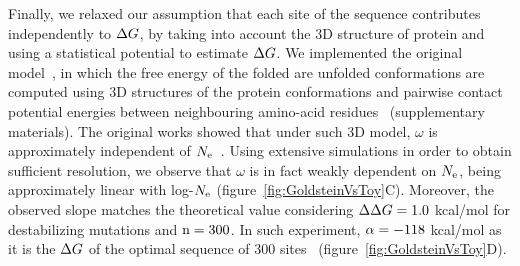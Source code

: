 Finally, we relaxed our assumption that each site of the sequence contributes independently to $\Delta G$, by taking into account the $3$D structure of protein and using a statistical potential to estimate $\Delta G$.
We implemented the original model~\citep{Williams2006, Goldstein2011, Pollock2012}, in which the free energy of the folded are unfolded conformations are computed using $3$D structures of the protein conformations and pairwise contact potential energies between neighbouring amino-acid residues~\citep{Miyazawa1985} (supplementary materials).
The original works showed that under such $3$D model, $\omega$ is approximately independent of $N_{\mathrm{e}}$~\citep{Goldstein2013}.
Using extensive simulations in order to obtain sufficient resolution, we observe that $\omega$ is in fact weakly dependent on $N_{\mathrm{e}}$, being approximately linear with log-$N_{\mathrm{e}}$ (figure~\ref{fig:GoldsteinVsToy}C).
Moreover, the observed slope matches the theoretical value considering $\Delta \Delta G = 1.0$ kcal/mol for destabilizing mutations and $\text{n}=300$.
In such experiment, $\alpha=-118$ kcal/mol as it is the $\Delta G$ of the optimal sequence of $300$ sites~\citep{Goldstein2011} (figure~\ref{fig:GoldsteinVsToy}D).
